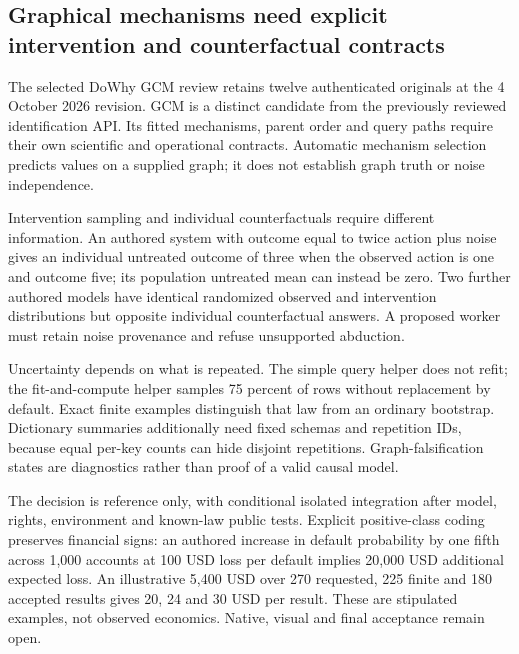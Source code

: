 \hypertarget{graphical-mechanisms-need-explicit-intervention-and-counterfactual-contracts}{%
\subsection{Graphical mechanisms need explicit intervention and
counterfactual
contracts}\label{graphical-mechanisms-need-explicit-intervention-and-counterfactual-contracts}}

The selected DoWhy GCM review retains twelve authenticated originals at
the 4 October 2026 revision. GCM is a distinct candidate from the
previously reviewed identification API. Its fitted mechanisms, parent
order and query paths require their own scientific and operational
contracts. Automatic mechanism selection predicts values on a supplied
graph; it does not establish graph truth or noise
independence.\citep{exec24_gcm_source,exec24_gcm_choice}

Intervention sampling and individual counterfactuals require different
information. An authored system with outcome equal to twice action plus
noise gives an individual untreated outcome of three when the observed
action is one and outcome five; its population untreated mean can
instead be zero. Two further authored models have identical randomized
observed and intervention distributions but opposite individual
counterfactual answers. A proposed worker must retain noise provenance
and refuse unsupported abduction.\citep{exec24_gcm_choice}

Uncertainty depends on what is repeated. The simple query helper does
not refit; the fit-and-compute helper samples 75 percent of rows without
replacement by default. Exact finite examples distinguish that law from
an ordinary bootstrap. Dictionary summaries additionally need fixed
schemas and repetition IDs, because equal per-key counts can hide
disjoint repetitions. Graph-falsification states are diagnostics rather
than proof of a valid causal
model.\citep{exec24_gcm_source,exec24_gcm_choice}

The decision is reference only, with conditional isolated integration
after model, rights, environment and known-law public tests. Explicit
positive-class coding preserves financial signs: an authored increase in
default probability by one fifth across 1,000 accounts at 100 USD loss
per default implies 20,000 USD additional expected loss. An illustrative
5,400 USD over 270 requested, 225 finite and 180 accepted results gives
20, 24 and 30 USD per result. These are stipulated examples, not
observed economics. Native, visual and final acceptance remain
open.\citep{exec24_gcm_choice}

